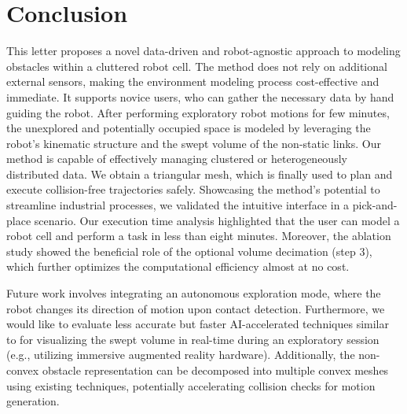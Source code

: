 \section{Conclusion}
\label{sec:conclusion}
\noindent This letter proposes a novel data-driven and robot-agnostic approach to modeling obstacles within a cluttered robot cell. 
The method does not rely on additional external sensors, 
making the environment modeling process cost-effective and immediate. 
It supports novice users, who can gather the necessary data by hand guiding the robot.
After performing exploratory robot motions for few minutes,
the unexplored and potentially occupied space is modeled by leveraging the robot's kinematic structure and the swept volume of the non-static links.
Our method is capable of effectively managing clustered or heterogeneously distributed data.
We obtain a triangular mesh, 
which is finally used to plan and execute collision-free trajectories safely.
Showcasing the method's potential to streamline industrial processes,
we validated the intuitive interface in a pick-and-place scenario.
Our execution time analysis highlighted that the user can model a robot cell and perform a task in less than eight minutes. 
Moreover, 
the ablation study showed the beneficial role of the optional volume decimation (step 3), 
which further optimizes the computational efficiency almost at no cost. 

Future work involves integrating an autonomous exploration mode, 
where the robot changes its direction of motion upon contact detection.
Furthermore, 
we would like to evaluate less accurate but faster AI-accelerated techniques similar to \cite{baxter2020deep,joho2024neural}
for visualizing the swept volume in real-time during an exploratory session (e.g., utilizing immersive augmented reality hardware).
Additionally, 
the non-convex obstacle representation can be decomposed 
into multiple convex meshes using existing techniques, 
potentially accelerating collision checks for motion generation.